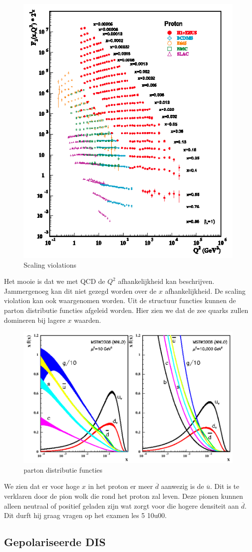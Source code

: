 \documentclass[../main.tex]{subfiles}
\begin{document}
\begin{figure}[h]
    \centering
    \includegraphics[width=0.4\linewidth]{DIS_nucleon_structuur_pdf/scale_viol.png}
    \caption{Scaling violations}%
    \label{fig:scale_viol}
\end{figure}

Het mooie is dat we met QCD de $Q^2$ afhankelijkheid kan beschrijven. Jammergenoeg kan dit niet gezegd worden over de $x$ afhankelijkheid. De scaling violation kan ook waargenomen worden. Uit  de structuur functies kunnen de parton distributie functies afgeleid worden. Hier zien we dat de zee quarks zullen domineren bij lagere $x$ waarden.

\begin{figure}[h]
    \centering
    \includegraphics[width=0.6\linewidth]{DIS_nucleon_structuur_pdf/part_dist_func.png}
    \caption{parton distributie functies}%
    \label{fig:part_dist_func}
\end{figure}

We zien dat er voor hoge $x$ in het proton er meer $\overline d$ aanwezig is de $\overline u$. Dit is te verklaren door de pion wolk die rond het proton zal leven. Deze pionen kunnen alleen neutraal of positief geladen zijn wat zorgt voor die hogere densiteit aan $\overline d$. {\color{red} Dit durft hij graag vragen op het examen les 5 10u00}.

\subsection{Gepolariseerde DIS}%
\label{sub:gepolariseerde_dis}
\end{document}
